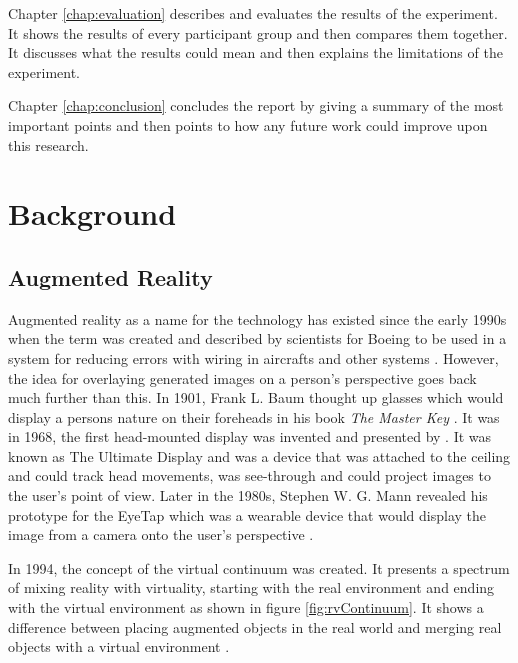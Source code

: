 \documentclass{l4proj}
\begin{document}
Chapter \ref{chap:evaluation} describes and evaluates the results of the experiment. It shows the results of every participant group and then compares them together. It discusses what the results could mean and then explains the limitations of the experiment.

Chapter \ref{chap:conclusion} concludes the report by giving a summary of the most important points and then points to how any future work could improve upon this research.

\chapter{Background}
\label{chap:background}

\section{Augmented Reality}

Augmented reality as a name for the technology has existed since the early 1990s when the term was created and described by scientists for Boeing to be used in a system for reducing errors with wiring in aircrafts and other systems \citep{caudell1992augmented}. However, the idea for overlaying generated images on a person's perspective goes back much further than this. In 1901, Frank L. Baum thought up glasses which would display a persons nature on their foreheads in his book \textit{The Master Key} \citep{vertucci_history_2023}. It was in 1968, the first head-mounted display was invented and presented by \cite{sutherland1965ultimate}. It was known as The Ultimate Display and was a device that was attached to the ceiling and could track head movements, was see-through and could project images to the user's point of view. Later in the 1980s, Stephen W. G. Mann revealed his prototype for the EyeTap which was a wearable device that would display the image from a camera onto the user's perspective \citep{vertucci_history_2023}.

In 1994, the concept of the virtual continuum was created. It presents a spectrum of mixing reality with virtuality, starting with the real environment and ending with the virtual environment as shown in figure \ref{fig:rvContinuum}. It shows a difference between placing augmented objects in the real world and merging real objects with a virtual environment \citep{milgram1994taxonomy}.
\end{document}
